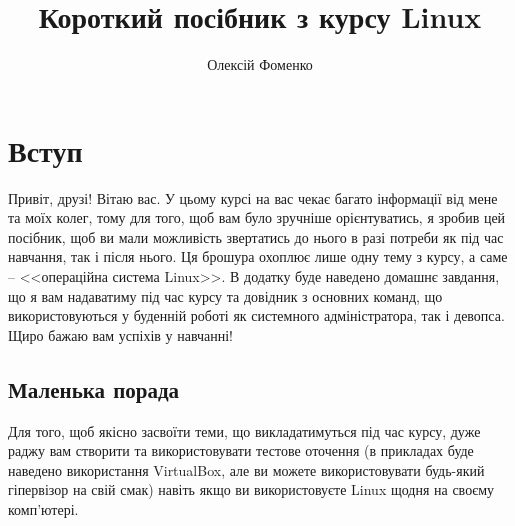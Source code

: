 \documentclass[10pt,a4paper]{fancyhandout}
\title{\textbf{Короткий посібник з курсу Linux}}
\author[О. Фоменко]{Олексій Фоменко}
\date{}
\begin{document}
\maketitle
\section{Вступ}
Привіт, друзі! Вітаю вас. У цьому курсі на вас чекає багато інформації від мене та моїх колег, тому для того, щоб вам було зручніше орієнтуватись, я зробив цей посібник, щоб ви мали можливість звертатись до нього в разі потреби як під час навчання, так і після нього. Ця брошура охоплює лише одну тему з курсу, а саме -- <<операційна система Linux>>. В додатку буде наведено домашнє завдання, що я вам надаватиму під час курсу та довідник з основних команд, що використовуються у буденній роботі як системного адміністратора, так і девопса. \\
Щиро бажаю вам успіхів у навчанні!

\subsection{Маленька порада}
Для того, щоб якісно засвоїти теми, що викладатимуться під час курсу, дуже раджу вам створити та використовувати тестове оточення (в прикладах буде наведено використання VirtualBox, але ви можете використовувати будь-який гіпервізор на свій смак) навіть якщо ви використовуєте Linux щодня на своєму комп'ютері.
\end{document}
